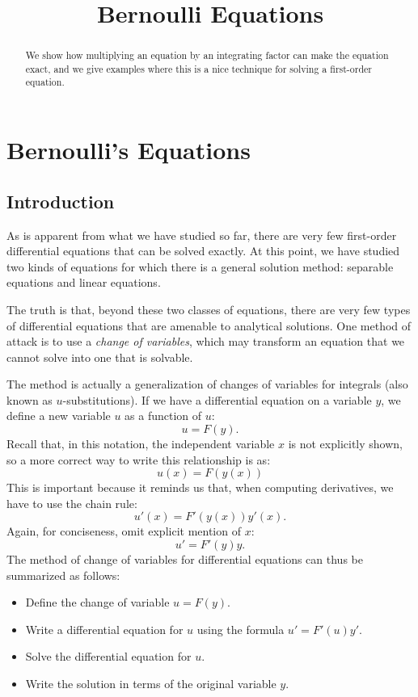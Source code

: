 \documentclass{ximera}
\title{Bernoulli Equations}
\begin{document}
\begin{abstract}
We show how multiplying an equation by an integrating factor can make the equation exact, and we give examples where this is a nice technique for solving a first-order equation.
\end{abstract}

\maketitle

\section*{Bernoulli's Equations}

\subsection*{Introduction}
As is apparent from what we have studied so far, there are very few first-order differential equations that can be solved exactly. At this point, we have studied two kinds of equations for which there is a general solution method: separable equations and linear equations.

The truth is that, beyond these two classes of equations, there are very few types of differential equations that are amenable to analytical solutions. One method of attack is to use a \textit{change of variables}, which may transform an equation that we cannot solve into one that is solvable.

The method is actually a generalization of changes of variables for integrals (also known as $u$-substitutions). If we have a differential equation on a variable $y$, we define a new variable $u$ as a function of $u$:
\[
u=F(y).
\]
Recall that, in this notation, the independent variable $x$ is not explicitly shown, so a more correct way to write this relationship is as:
\[
u(x)=F(y(x))
\]
This is important because it reminds us that, when computing derivatives, we have to use the chain rule:
\[
u'(x)=F'(y(x))y'(x).
\]
Again, for conciseness, omit explicit mention of $x$:
\[
u'=F'(y)y.
\]
The method of change of variables for differential equations can thus be summarized as follows:

\begin{itemize}
\item Define the change of variable $u=F(y)$.
\item Write a differential equation for $u$ using the formula $u'=F'(u)y'$.
\item Solve the differential equation for $u$.
\item Write the solution in terms of the original variable $y$.
\end{itemize}
\end{document}
